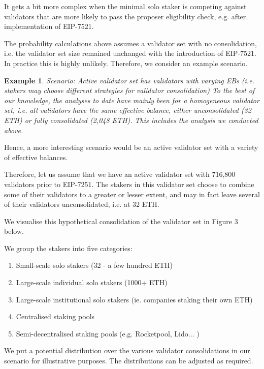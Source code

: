 \documentclass{article}
\newtheorem{example}{Example}
\begin{document}
It gets a bit more complex when the minimal solo staker is competing against
validators that are more likely to pass the proposer eligibility check, e.g.
after implementation of EIP-7521.

The probability calculations above assumes a validator set with no
consolidation, i.e. the validator set size remained unchanged with the
introduction of EIP-7521. In practice this is highly unlikely. Therefore, we
consider an example scenario.

\begin{example} Scenario: \emph{Active validator set has validators with
    varying EBs (i.e. stakers may choose different strategies for validator
    consolidation)} To the best of our knowledge, the analyses to date have
    mainly been for a homogeneous validator set, i.e. all validators have the
    same effective balance, either unconsolidated (32 ETH) or fully
    consolidated (2,048 ETH). This includes the analysis we conducted above.
  \end{example}

Hence, a more interesting scenario would be an active validator set with a
variety of effective balances.


Therefore, let us assume that we have an active validator set with 716,800
validators prior to EIP-7251. The stakers in this validator set choose to
combine some of their validators to a greater or lesser extent, and may in fact
leave several of their validators unconsolidated, i.e. at 32 ETH.

We visualise this hypothetical consolidation of the validator set in Figure 3
below.

We group the stakers into five categories:
\begin{enumerate}
\item Small-scale solo stakers (32 - a few hundred ETH)
\item Large-scale individual solo stakers (1000+ ETH)
\item Large-scale institutional solo stakers (ie. companies staking their own ETH)
\item Centralised staking pools
\item Semi-decentralised staking pools (e.g. Rocketpool, Lido... )
\end{enumerate}


We put a potential distribution over the various validator consolidations in our scenario for illustrative purposes. The distributions can be adjusted as required.
\end{document}
